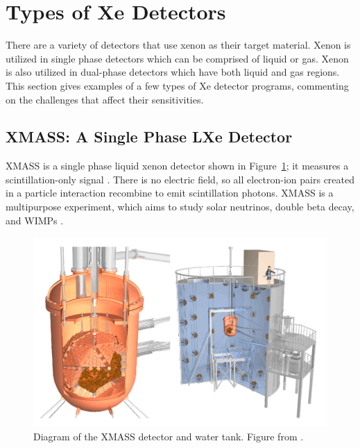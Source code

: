  
\FloatBarrier
\section{Types of Xe Detectors}
\label{sec:xe_detectors}
There are a variety of detectors that use xenon as their target material. Xenon is utilized in single phase detectors which can be comprised of liquid or gas. Xenon is also utilized in dual-phase detectors which have both liquid and gas regions. This section gives examples of a few types of Xe detector programs, commenting on the challenges that affect their sensitivities. 

\subsection{XMASS: A Single Phase LXe Detector}
XMASS is a single phase liquid xenon detector shown in Figure~\ref{fig:xmass}; it measures a scintillation-only signal \cite{Abe2013}. There is no electric field, so all electron-ion pairs created in a particle interaction recombine to emit scintillation photons. XMASS is a multipurpose experiment, which aims to study solar neutrinos, double beta decay, and \ac{WIMP}s \cite{Chepel2013}.

\begin{figure}[htbp]
\begin{center}
\includegraphics[width=\textwidth]{figures/lxetpcs/xmass.png}
\caption{Diagram of the XMASS detector and water tank. Figure from \cite{Chepel2013}. }
\label{fig:xmass}
\end{center}
\end{figure}

